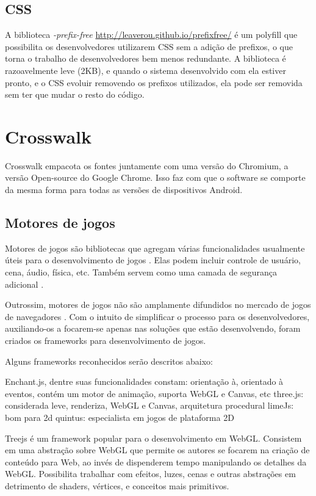 \section{CSS}

A biblioteca \textit{-prefix-free} \url{http://leaverou.github.io/prefixfree/}
é um polyfill que possibilita os desenvolvedores utilizarem CSS sem
a adição de prefixos, o que torna o trabalho de desenvolvedores bem
menos redundante. A biblioteca é razoavelmente leve (2KB), e quando o
sistema desenvolvido com ela estiver pronto, e o CSS evoluir removendo os
prefixos utilizados, ela pode ser removida sem ter que mudar o resto do código.

\chapter{Crosswalk} \label{crosswalk}

Crosswalk empacota os fontes juntamente com uma versão do Chromium, a
versão Open-source do Google Chrome. Isso faz com que o software se
comporte da mesma forma para todas as versões de dispositivos Android.

\section{Motores de jogos}

Motores de jogos são bibliotecas que agregam várias funcionalidades
usualmente úteis para o desenvolvimento de jogos \autocite[p.
5]{browserGamesTechnologyAndFuture}. Elas podem incluir controle de
usuário, cena, áudio, física, etc. Também servem como uma camada de
segurança adicional \autocite{browserGamesTechnologyAndFuture}.

Outrossim, motores de jogos não são amplamente difundidos no mercado
de jogos de navegadores \autocite{browserGamesTechnologyAndFuture}.
Com o intuito de simplificar o processo para os desenvolvedores,
auxiliando-os a focarem-se apenas nas soluções que estão
desenvolvendo, foram criados os frameworks para desenvolvimento de
jogos. 

Alguns frameworks reconhecidos serão descritos abaixo:

Enchant.js, dentre suas funcionalidades constam: orientação à,
orientado à eventos, contém um motor de animação, suporta WebGL
e Canvas, etc three.js: considerada leve, renderiza, WebGL e Canvas,
arquitetura procedural limeJs: bom para 2d quintus: especialista em
jogos de plataforma 2D

Treejs é um framework popular para o desenvolvimento em WebGL.
Consistem em uma abstração sobre WebGL que permite os autores se
focarem na criação de conteúdo para Web, ao invés de dispenderem
tempo manipulando os detalhes da WebGL. Possibilita trabalhar com
efeitos, luzes, cenas e outras abstrações em detrimento de shaders,
vértices, e conceitos mais primitivos.

